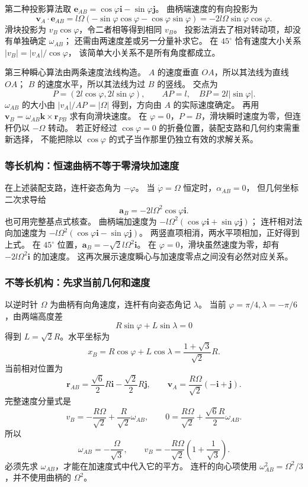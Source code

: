 \documentclass[UTF8,zihao=-4,fontset=fandol,a4paper]{ctexart}
\newcommand{\vect}[1]{\bm{#1}}
\begin{document}
第二种投影算法取 $\vect e_{AB}=\cos\varphi\vect i-\sin\varphi\vect j$。
曲柄端速度的有向投影为
\[
\vect v_A\cdot\vect e_{AB}
=l\Omega(-\sin\varphi\cos\varphi-\cos\varphi\sin\varphi)
=-2l\Omega\sin\varphi\cos\varphi.
\]
滑块投影为 $v_B\cos\varphi$，令二者相等得到相同 $v_B$。
投影法消去了相对转动项，却没有单独确定 $\omega_{AB}$；
还需由两速度差或另一分量补求它。
在 $45^\circ$ 恰有速度大小关系 $|v_B|=|v_A|/\cos\varphi$，
该简单大小关系不是所有角度都成立。

第三种瞬心算法由两条速度法线构造。
$A$ 的速度垂直 $OA$，所以其法线为直线 $OA$；
$B$ 的速度水平，所以其法线为过 $B$ 的竖线。
交点为
\[
P=(2l\cos\varphi,2l\sin\varphi),\qquad
AP=l,\quad BP=2l|\sin\varphi|.
\]
$\omega_{AB}$ 的大小由 $|v_A|/AP=|\Omega|$ 得到，方向由 $A$ 的实际速度确定。
再用 $\vect v_B=\omega_{AB}\vect k\times\vect r_{PB}$ 求有向滑块速度。
在 $\varphi=0$，$P=B$，滑块瞬时速度为零，但连杆仍以 $-\Omega$ 转动。
若正好经过 $\cos\varphi=0$ 的折叠位置，装配支路和几何约束需重新选择，
不能把除以 $\cos\varphi$ 的式子当作那里仍独立有效的求解关系。

\subsubsection*{等长机构：恒速曲柄不等于零滑块加速度}
在上述装配支路，连杆姿态角为 $-\varphi$。
当 $\dot\varphi=\Omega$ 恒定时，$\alpha_{AB}=0$，
但几何坐标二次求导给
\[
\vect a_B=-2l\Omega^2\cos\varphi\vect i.
\]
也可用完整基点式核查。
曲柄端加速度为 $-l\Omega^2(\cos\varphi\vect i+\sin\varphi\vect j)$；
连杆相对法向加速度为
$-l\Omega^2(\cos\varphi\vect i-\sin\varphi\vect j)$。
两竖直项相消，两水平项相加，正好得到上式。
在 $45^\circ$ 位置，$\vect a_B=-\sqrt2l\Omega^2\vect i$。
在 $\varphi=0$，滑块虽然速度为零，却有 $-2l\Omega^2\vect i$ 的加速度。
这再次展示速度瞬心与加速度零点之间没有必然对应关系。

\subsubsection*{不等长机构：先求当前几何和速度}
以逆时针 $\Omega$ 为曲柄有向角速度，连杆有向姿态角记 $\lambda$。
当前 $\varphi=\pi/4,\lambda=-\pi/6$，由两端高度差
\[
R\sin\varphi+L\sin\lambda=0
\]
得到 $L=\sqrt2R$。水平坐标为
\[
x_B=R\cos\varphi+L\cos\lambda
=\frac{1+\sqrt3}{\sqrt2}R.
\]
当前相对位置为
\[
\vect r_{AB}=\frac{\sqrt6}{2}R\vect i-\frac{\sqrt2}{2}R\vect j,
\qquad
\vect v_A=\frac{R\Omega}{\sqrt2}(-\vect i+\vect j).
\]
完整速度分量式是
\[
v_B=-\frac{R\Omega}{\sqrt2}+\frac{R}{\sqrt2}\omega_{AB},\qquad
0=\frac{R\Omega}{\sqrt2}+\frac{\sqrt6R}{2}\omega_{AB}.
\]
所以
\[
\omega_{AB}=-\frac\Omega{\sqrt3},\qquad
v_B=-\frac{R\Omega}{\sqrt2}\left(1+\frac1{\sqrt3}\right).
\]
必须先求 $\omega_{AB}$，才能在加速度式中代入它的平方。
连杆的向心项使用 $\omega_{AB}^2=\Omega^2/3$，并不使用曲柄的 $\Omega^2$。
\end{document}
